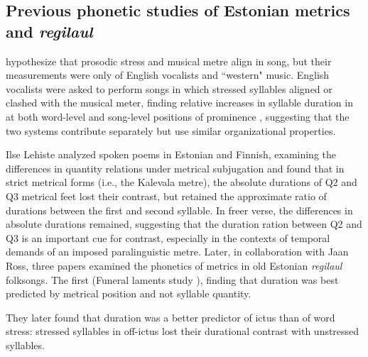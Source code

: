 %
\subsection{Previous phonetic studies of Estonian metrics and {\it regilaul}}

 \citep{palmerLinguisticProsodyMusical1992} hypothesize that prosodic stress and musical metre align in song, but their measurements were only of English vocalists and ``western" music. 
English vocalists were asked to perform songs in which stressed syllables aligned or clashed with the musical meter, finding relative increases in syllable duration in at both word-level and song-level positions of prominence \citep{palmerLinguisticProsodyMusical1992}, suggesting that the two systems contribute separately but use similar organizational properties.

Ilse Lehiste analyzed spoken poems in Estonian and Finnish, examining the differences in quantity relations under metrical subjugation and found that in strict metrical forms (i.e., the Kalevala metre), the absolute durations of Q2 and Q3 metrical feet lost their contrast, but retained the approximate ratio of durations between the first and second syllable. In freer verse, the differences in absolute durations remained, suggesting that the duration ration between Q2 and Q3 is an important cue for contrast, especially in the contexts of temporal demands of an imposed paralinguistic metre. 
\citep{lehistePhoneticsMetrics1992} Later, in collaboration with Jaan Ross, three papers examined the phonetics of metrics in old Estonian {\it regilaul} folksongs. The first (Funeral laments study )\citep{rossLostProsodicOppositions1994}, finding that duration was best predicted by metrical position and not syllable quantity. 




They later found that duration was a better predictor of ictus  than of word stress: stressed syllables in off-ictus lost their durational contrast with unstressed syllables.  \citep{rossTradeoffQuantityStress1996} 

